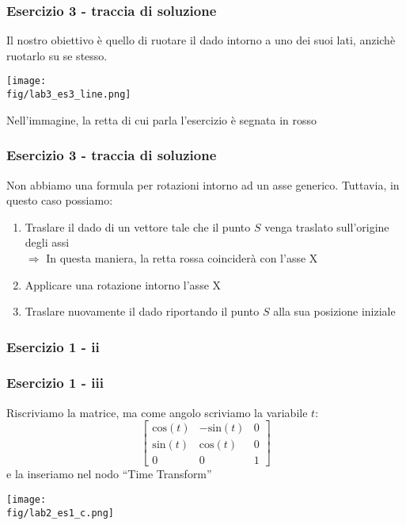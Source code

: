 \documentclass{beamer}
\newcommand{\fig}{figures} %
\begin{document}
\begin{frame}
\frametitle{Esercizio 3 - traccia di soluzione}
Il nostro obiettivo \`e quello di ruotare il dado intorno a uno dei suoi lati, anzich\`e ruotarlo
su se stesso.

    \vspace{0.5cm}

    \centering
    \texttt{[image: \\fig/lab3\_es3\_line.png]}

Nell'immagine, la retta di cui parla l'esercizio \`e segnata in rosso

\end{frame}


\begin{frame}
\frametitle{Esercizio 3 - traccia di soluzione}
Non abbiamo una formula per rotazioni intorno ad un asse generico. Tuttavia,
in questo caso possiamo:
    \begin{enumerate}
        \item Traslare il dado di un vettore tale che il punto $S$ venga traslato sull'origine degli assi \\
            $\Rightarrow$ In questa maniera, la retta rossa coincider\`a con l'asse X
        \item Applicare una rotazione intorno l'asse X
        \item Traslare nuovamente il dado riportando il punto $S$ alla sua posizione iniziale
    \end{enumerate}

\end{frame}

\begin{frame}
\frametitle{Esercizio 1 - ii}
\begin{center}
\end{center}
\end{frame}

\begin{frame}
\frametitle{Esercizio 1 - iii}
Riscriviamo la matrice, ma come angolo scriviamo la variabile $t$:
\begin{equation*}
\begin{bmatrix}
\mbox{cos}(t) & - \mbox{sin}(t) & 0\\
\mbox{sin}(t) & \mbox{cos}(t)   & 0\\ 
0 & 0 & 1 
\end{bmatrix}
\end{equation*}
e la inseriamo nel nodo ``Time Transform''

    \vspace{0.2cm}
\centering
\texttt{[image: \\fig/lab2\_es1\_c.png]}
\end{frame}
\end{document}
